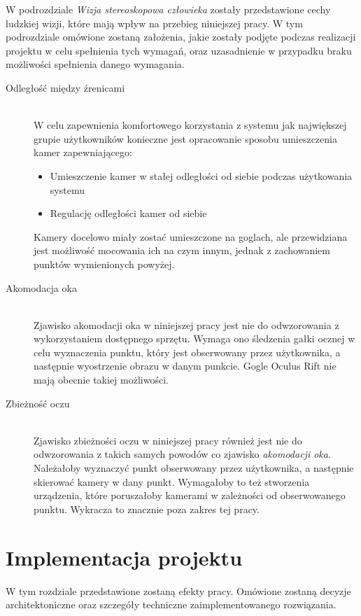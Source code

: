 \documentclass[a4paper,11pt,twoside]{report}
\theoremstyle{definition}
\begin{document}
W podrozdziale \textit{Wizja stereoskopowa człowieka} zostały przedstawione cechy ludzkiej wizji, które mają wpływ na przebieg niniejszej pracy. W tym podrozdziale omówione zostaną założenia, jakie zostały podjęte podczas realizacji projektu w celu spełnienia tych wymagań, oraz uzasadnienie w przypadku braku możliwości spełnienia danego wymagania.

\begin{description}

\item[Odległość między źrenicami] \hfill \\
W celu zapewnienia komfortowego korzystania z systemu jak największej grupie użytkowników konieczne jest opracowanie sposobu umieszczenia kamer zapewniającego:
\begin{itemize}
\item Umieszczenie kamer w stałej odległości od siebie podczas użytkowania systemu
\item Regulację odległości kamer od siebie
\end{itemize}

Kamery docelowo miały zostać umieszczone na goglach, ale przewidziana jest możliwość mocowania ich na czym innym, jednak z zachowaniem punktów wymienionych powyżej.

\item [Akomodacja oka] \hfill \\
Zjawisko akomodacji oka w niniejszej pracy jest nie do odwzorowania z wykorzystaniem dostępnego sprzętu. Wymaga ono śledzenia gałki ocznej w celu wyznaczenia punktu, który jest obserwowany przez użytkownika, a następnie wyostrzenie obrazu w danym punkcie. Gogle Oculus Rift nie mają obecnie takiej możliwości.

\item[Zbieżność oczu] \hfill \\
Zjawisko zbieżności oczu w niniejszej pracy również jest nie do odwzorowania z takich samych powodów co zjawisko \textit{akomodacji oka}. Należałoby wyznaczyć punkt obserwowany przez użytkownika, a następnie skierować kamery w dany punkt. Wymagałoby to też stworzenia urządzenia, które poruszałoby kamerami w zależności od obserwowanego punktu. Wykracza to znacznie poza zakres tej pracy.

\end{description}

\chapter{Implementacja projektu}
W tym rozdziale przedstawione zostaną efekty pracy. Omówione zostaną decyzje architektoniczne oraz szczegóły techniczne zaimplementowanego rozwiązania.
\end{document}
